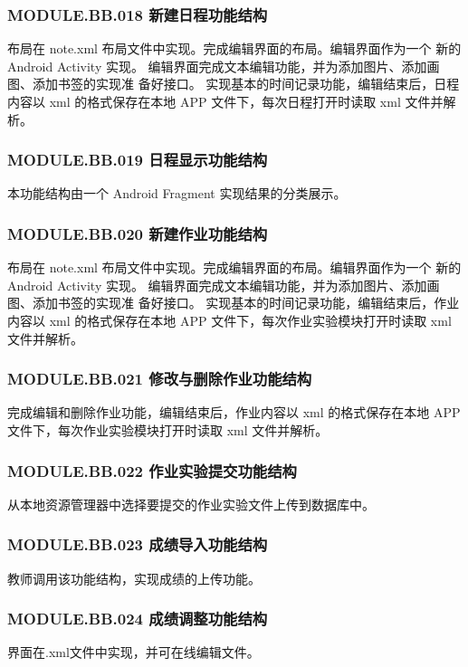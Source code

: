 \subsubsection{MODULE.BB.018    新建日程功能结构}
布局在 note.xml 布局文件中实现。完成编辑界面的布局。编辑界面作为一个 新的 Android Activity 实现。
编辑界面完成文本编辑功能，并为添加图片、添加画图、添加书签的实现准 备好接口。
实现基本的时间记录功能，编辑结束后，日程内容以 xml 的格式保存在本地 APP 文件下，每次日程打开时读取 xml 文件并解析。

\subsubsection{MODULE.BB.019    日程显示功能结构}
本功能结构由一个 Android Fragment 实现结果的分类展示。

\subsubsection{MODULE.BB.020    新建作业功能结构}
布局在 note.xml 布局文件中实现。完成编辑界面的布局。编辑界面作为一个 新的 Android Activity 实现。
编辑界面完成文本编辑功能，并为添加图片、添加画图、添加书签的实现准 备好接口。
实现基本的时间记录功能，编辑结束后，作业内容以 xml 的格式保存在本地 APP 文件下，每次作业实验模块打开时读取 xml 文件并解析。

\subsubsection{MODULE.BB.021    修改与删除作业功能结构}
完成编辑和删除作业功能，编辑结束后，作业内容以 xml 的格式保存在本地 APP 文件下，每次作业实验模块打开时读取 xml 文件并解析。

\subsubsection{MODULE.BB.022    作业实验提交功能结构}
从本地资源管理器中选择要提交的作业实验文件上传到数据库中。

\subsubsection{MODULE.BB.023    成绩导入功能结构}
教师调用该功能结构，实现成绩的上传功能。

\subsubsection{MODULE.BB.024    成绩调整功能结构}
界面在.xml文件中实现，并可在线编辑文件。 

